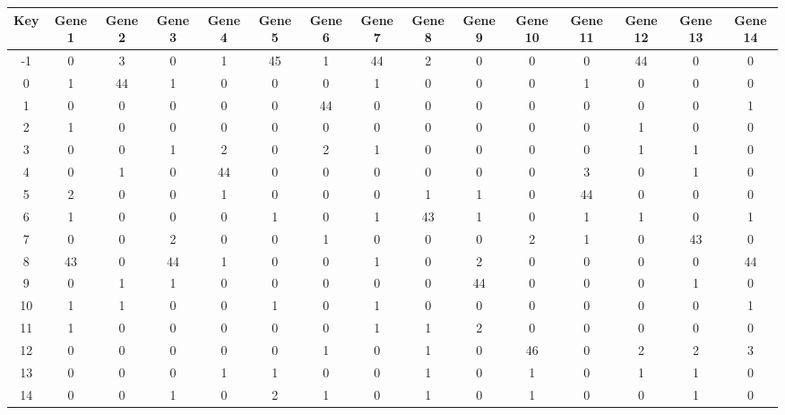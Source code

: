 \begin{tabular}{|c|c|c|c|c|c|c|c|c|c|c|c|c|c|c|}
\hline
Key & Gene 1 & Gene 2 & Gene 3 & Gene 4 & Gene 5 & Gene 6 & Gene 7 & Gene 8 & Gene 9 & Gene 10 & Gene 11 & Gene 12 & Gene 13 & Gene 14 \\
\hline
-1 & 0 & 3 & 0 & 1 & 45 & 1 & 44 & 2 & 0 & 0 & 0 & 44 & 0 & 0 \\
0 & 1 & 44 & 1 & 0 & 0 & 0 & 1 & 0 & 0 & 0 & 1 & 0 & 0 & 0 \\
1 & 0 & 0 & 0 & 0 & 0 & 44 & 0 & 0 & 0 & 0 & 0 & 0 & 0 & 1 \\
2 & 1 & 0 & 0 & 0 & 0 & 0 & 0 & 0 & 0 & 0 & 0 & 1 & 0 & 0 \\
3 & 0 & 0 & 1 & 2 & 0 & 2 & 1 & 0 & 0 & 0 & 0 & 1 & 1 & 0 \\
4 & 0 & 1 & 0 & 44 & 0 & 0 & 0 & 0 & 0 & 0 & 3 & 0 & 1 & 0 \\
5 & 2 & 0 & 0 & 1 & 0 & 0 & 0 & 1 & 1 & 0 & 44 & 0 & 0 & 0 \\
6 & 1 & 0 & 0 & 0 & 1 & 0 & 1 & 43 & 1 & 0 & 1 & 1 & 0 & 1 \\
7 & 0 & 0 & 2 & 0 & 0 & 1 & 0 & 0 & 0 & 2 & 1 & 0 & 43 & 0 \\
8 & 43 & 0 & 44 & 1 & 0 & 0 & 1 & 0 & 2 & 0 & 0 & 0 & 0 & 44 \\
9 & 0 & 1 & 1 & 0 & 0 & 0 & 0 & 0 & 44 & 0 & 0 & 0 & 1 & 0 \\
10 & 1 & 1 & 0 & 0 & 1 & 0 & 1 & 0 & 0 & 0 & 0 & 0 & 0 & 1 \\
11 & 1 & 0 & 0 & 0 & 0 & 0 & 1 & 1 & 2 & 0 & 0 & 0 & 0 & 0 \\
12 & 0 & 0 & 0 & 0 & 0 & 1 & 0 & 1 & 0 & 46 & 0 & 2 & 2 & 3 \\
13 & 0 & 0 & 0 & 1 & 1 & 0 & 0 & 1 & 0 & 1 & 0 & 1 & 1 & 0 \\
14 & 0 & 0 & 1 & 0 & 2 & 1 & 0 & 1 & 0 & 1 & 0 & 0 & 1 & 0 \\
\hline
\end{tabular}